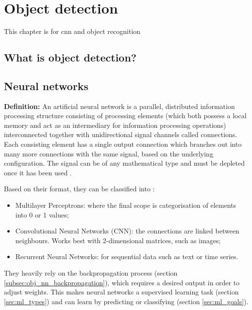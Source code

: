 \chapter{Object detection}
\label{chap:obj}

This chapter is for cnn and object recognition

\section{What is object detection?}
\label{sec:obj_what}

\qquad 

\section{Neural networks}
\label{sec:obj_nn}

\qquad \textbf{Definition:} An artificial neural network is a parallel, distributed information processing structure consisting of processing elements (which both possess a local memory and act as an intermediary for information processing operations) interconnected together with unidirectional signal channels called connections. Each consisting element has a single output connection which branches out into many more connections with the same signal, based on the underlying configuration. The signal can be of any mathematical type and must be depleted once it has been used \cite{backpropagation}.

\qquad Based on their format, they can be classified into \cite{toulouse-nn}:

\begin{itemize}
\item{Multilayer Perceptrons: where the final scope is categorisation of elements into 0 or 1 values;}
\item{Convolutional Neural Networks (CNN): the connections are linked between neighbours. Works best with 2-dimensional matrices, such as images;}
\item{Recurrent Neural Networks: for sequential data such as text or time series.}
\end{itemize}

\qquad They heavily rely on the backpropagation process (section \ref{subsec:obj_nn_backpropagation}), which requires a desired output in order to adjust weights. This makes neural networks a supervised learning task (section \ref{sec:ml_types}) and can learn by predicting or classifying (section \ref{sec:ml_goals}).

